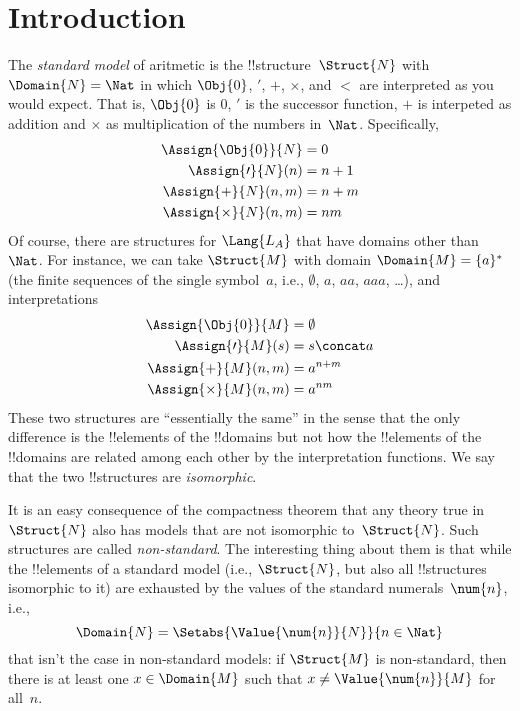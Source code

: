 \documentclass[../../../include/open-logic-section]{subfiles}
\begin{document}
\section{Introduction}

The \emph{standard model} of aritmetic is the
!!{structure}~$\Struct{N}$ with $\Domain{N} = \Nat$ in which
$\Obj{0}$, $\prime$, $+$, $\times$, and $<$ are interpreted as you
would expect. That is, $\Obj{0}$ is $0$, $\prime$ is the successor
function, $+$ is interpeted as addition and $\times$ as multiplication
of the numbers in~$\Nat$. Specifically,
\begin{align*}
  \Assign{\Obj{0}}{N} & = 0\\
  \Assign{\prime}{N}(n) & = n + 1\\
  \Assign{+}{N}(n, m) & = n + m\\
  \Assign{\times}{N}(n, m) & = nm
\end{align*}
Of course, there are structures for $\Lang{L_A}$ that have domains
other than~$\Nat$. For instance, we can take $\Struct{M}$ with domain
$\Domain{M} = \{a\}^*$ (the finite sequences of the single
symbol~$a$, i.e., $\emptyset$, $a$, $aa$, $aaa$, \dots), and
interpretations
\begin{align*}
  \Assign{\Obj{0}}{M} & = \emptyset\\
  \Assign{\prime}{M}(s) & = s \concat a\\
  \Assign{+}{M}(n, m) & = a^{n + m}\\
  \Assign{\times}{M}(n, m) & = a^{nm}
\end{align*}
These two structures are ``essentially the same'' in the sense that
the only difference is the !!{element}s of the !!{domain}s but not how
the !!{element}s of the !!{domain}s are related among each other by
the interpretation functions. We say that the two !!{structure}s are
\emph{isomorphic}.

It is an easy consequence of the compactness theorem that any theory
true in~$\Struct{N}$ also has models that are not isomorphic
to~$\Struct{N}$.  Such structures are called \emph{non-standard}.  The
interesting thing about them is that while the !!{element}s of a
standard model (i.e., $\Struct{N}$, but also all !!{structure}s
isomorphic to it) are exhausted by the values of the standard
numerals~$\num{n}$, i.e.,
\[
\Domain{N} = \Setabs{\Value{\num{n}}{N}}{n \in \Nat}
\]
that isn't the case in non-standard models: if $\Struct{M}$ is
non-standard, then there is at least one $x \in \Domain{M}$ such that
$x \neq \Value{\num{n}}{M}$ for all~$n$.
\end{document}

